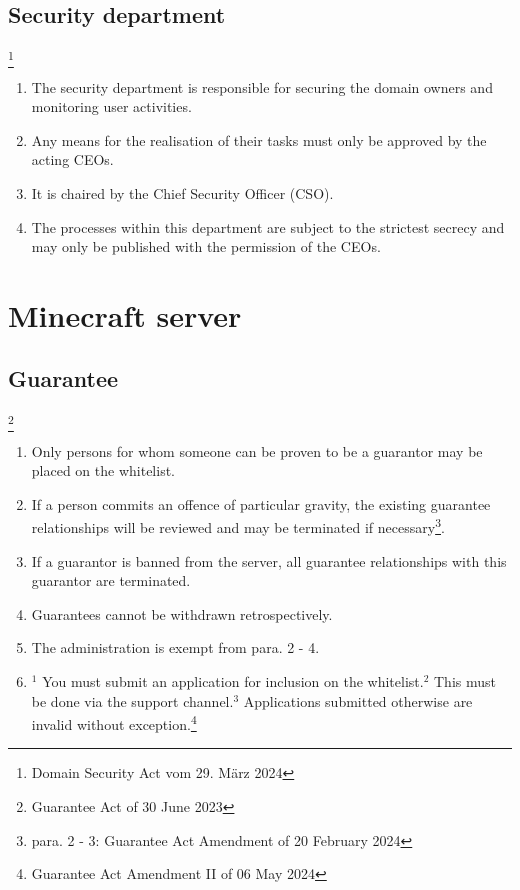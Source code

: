 \documentclass{article}
\begin{document}
\subsection{Security department}\footnote{Domain Security Act vom 29. März 2024}
\begin{enumerate}[(1)]
	\item The security department is responsible for securing the domain owners and monitoring user activities.
	\item Any means for the realisation of their tasks must only be approved by the acting CEOs.
	\item It is chaired by the Chief Security Officer (CSO).
	\item The processes within this department are subject to the strictest secrecy and may only be published with the permission of the CEOs.
\end{enumerate}

\section{Minecraft server}

\subsection{Guarantee}\footnote{Guarantee Act of 30 June 2023}
\begin{enumerate}[(1)]
	\item Only persons for whom someone can be proven to be a guarantor may be placed on the whitelist.
	\item If a person commits an offence of particular gravity, the existing guarantee relationships will be reviewed and may be terminated if necessary\footnote{para. 2 - 3: Guarantee Act Amendment of 20 February 2024}.
	\item If a guarantor is banned from the server, all guarantee relationships with this guarantor are terminated.
	\item Guarantees cannot be withdrawn retrospectively.
	\item The administration is exempt from para. 2 - 4.
	\item $^{1}$ You must submit an application for inclusion on the whitelist.$^{2}$ This must be done via the support channel.$^{3}$ Applications submitted otherwise are invalid without exception.\footnote{Guarantee Act Amendment II of 06 May 2024}
\end{enumerate}
\end{document}
